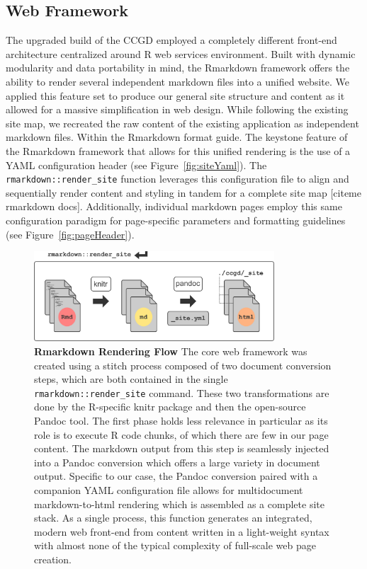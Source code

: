 \documentclass[10pt]{report}
\begin{document}
\subsection{Web Framework}
The upgraded build of the CCGD employed a completely different front-end architecture centralized around R web services environment. Built with dynamic modularity and data portability in mind, the Rmarkdown framework offers the ability to render several independent markdown files into a unified website. We applied this feature set to produce our general site structure and content as it allowed for a massive simplification in web design. While following the existing site map, we recreated the raw content of the existing application as independent markdown files. Within the Rmarkdown format guide. The keystone feature of the Rmarkdown framework that allows for this unified rendering is the use of a YAML configuration header (see Figure~\ref{fig:siteYaml}). The \texttt{rmarkdown::render\_site} function leverages this configuration file to align and sequentially render content and styling in tandem for a complete site map [citeme rmarkdown docs]. Additionally, individual markdown pages employ this same configuration paradigm for page-specific parameters and formatting guidelines (see Figure~\ref{fig:pageHeader}).

\begin{figure}[H]
    \center{}
    \includegraphics[width=0.8\textwidth]{fig/rmarkdown_flow.pdf}
    \caption[Rmarkdown Rendering Flow]{\textbf{Rmarkdown Rendering Flow} The core web framework was created using a stitch process composed of two document conversion steps, which are both contained in the single \texttt{rmarkdown::render\_site} command. These two transformations are done by the R-specific knitr package and then the open-source Pandoc tool. The first phase holds less relevance in particular as its role is to execute R code chunks, of which there are few in our page content. The markdown output from this step is seamlessly injected into a Pandoc conversion which offers a large variety in document output. Specific to our case, the Pandoc conversion paired with a companion YAML configuration file allows for multidocument markdown-to-html rendering which is assembled as a complete site stack. As a single process, this function generates an integrated, modern web front-end from content written in a light-weight syntax with almost none of the typical complexity of full-scale web page creation.}\label{fig:renderFlow}
\end{figure}
\end{document}
